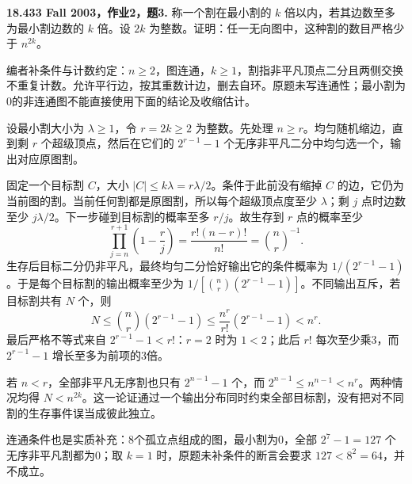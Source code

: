 \begin{exercise}\label{mit:18433-a2-q3}
\textbf{18.433 Fall 2003，作业2，题3.}
称一个割在最小割的 $k$ 倍以内，若其边数至多为最小割边数的 $k$ 倍。设 $2k$ 为整数。证明：任一无向图中，这种割的数目严格少于 $n^{2k}$。

编者补条件与计数约定：$n\ge2$，图连通，$k\ge1$，割指非平凡顶点二分且两侧交换不重复计数。允许平行边，按其重数计边，删去自环。原题未写连通性；最小割为0的非连通图不能直接使用下面的结论及收缩估计。
\end{exercise}
\begin{solution}
设最小割大小为 $\lambda\ge1$，令 $r=2k\ge2$ 为整数。先处理 $n\ge r$。均匀随机缩边，直到剩 $r$ 个超级顶点，然后在它们的 $2^{r-1}-1$ 个无序非平凡二分中均匀选一个，输出对应原图割。

固定一个目标割 $C$，大小 $|C|\le k\lambda=r\lambda/2$。条件于此前没有缩掉 $C$ 的边，它仍为当前图的割。当前任何割都是原图割，所以每个超级顶点度至少 $\lambda$；剩 $j$ 点时边数至少 $j\lambda/2$。下一步碰到目标割的概率至多 $r/j$。故生存到 $r$ 点的概率至少
\[
 \prod_{j=n}^{r+1}\left(1-\frac rj\right)
 =\frac{r!(n-r)!}{n!}=\binom nr^{-1}.
\]
生存后目标二分仍非平凡，最终均匀二分恰好输出它的条件概率为 $1/(2^{r-1}-1)$。于是每个目标割的输出概率至少为
$1/[\binom nr(2^{r-1}-1)]$。不同输出互斥，若目标割共有 $N$ 个，则
\[
 N\le\binom nr(2^{r-1}-1)
 \le\frac{n^r}{r!}(2^{r-1}-1)<n^r.
\]
最后严格不等式来自 $2^{r-1}-1<r!$：$r=2$ 时为 $1<2$；此后 $r!$ 每次至少乘3，而 $2^{r-1}-1$ 增长至多为前项的3倍。

若 $n<r$，全部非平凡无序割也只有 $2^{n-1}-1$ 个，而 $2^{n-1}\le n^{n-1}<n^r$。两种情况均得 $N<n^{2k}$。这一论证通过一个输出分布同时约束全部目标割，没有把对不同割的生存事件误当成彼此独立。

连通条件也是实质补充：8个孤立点组成的图，最小割为0，全部 $2^7-1=127$ 个无序非平凡割都为0；取 $k=1$ 时，原题未补条件的断言会要求 $127<8^2=64$，并不成立。
\end{solution}

